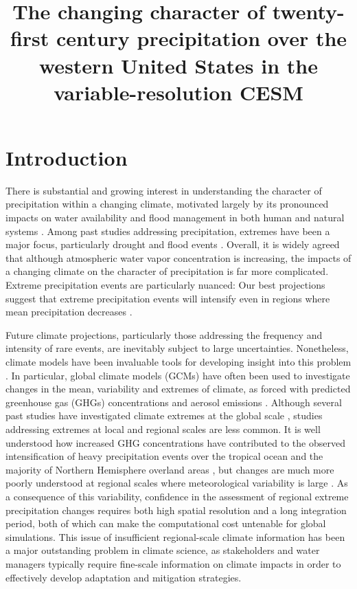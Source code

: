 \documentclass{ametsoc}
\title{The changing character of twenty-first century precipitation over the western United States in the variable-resolution CESM}
\affiliation{Department of Land, Air and Water Resources, University of California, Davis}
\begin{document}
\maketitle


%
\section{Introduction}

There is substantial and growing interest in understanding the character of precipitation within a changing climate, motivated largely by its pronounced impacts on water availability and flood management in both human and natural systems \citep{hegerl2004detectability, kharin2007changes, scoccimarro2013heavy}.  Among past studies addressing precipitation, extremes have been a major focus, particularly drought and flood events \citep{seneviratne2012changes}.  Overall, it is widely agreed that although atmospheric water vapor concentration is increasing, the impacts of a changing climate on the character of precipitation is far more complicated.  Extreme precipitation events are particularly nuanced:  Our best projections suggest that extreme precipitation events will intensify even in regions where mean precipitation decreases \citep{tebaldi2006going, kharin2007changes}.


Future climate projections, particularly those addressing the frequency and intensity of rare events, are inevitably subject to large uncertainties.  Nonetheless, climate models have been invaluable tools for developing insight into this problem \citep{easterling2000climate}. In particular, global climate models (GCMs) have often been used to investigate changes in the mean, variability and extremes of climate, as forced with predicted greenhouse gas (GHGs) concentrations and aerosol emissions \citep{meehl2006future}. Although several past studies have investigated climate extremes at the global scale \citep{seneviratne2012changes}, studies addressing extremes at local and regional scales are less common.  It is well understood how increased GHG concentrations have contributed to the observed intensification of heavy precipitation events over the tropical ocean \citep{allan2008atmospheric} and the majority of Northern Hemisphere overland areas \citep{min2011human}, but changes are much more poorly understood at regional scales where meteorological variability is large \citep{trenberth2011changes}.  As a consequence of this variability, confidence in the assessment of regional extreme precipitation changes requires both high spatial resolution and a long integration period, both of which can make the computational cost untenable for global simulations.  This issue of insufficient regional-scale climate information has been a major outstanding problem in climate science, as stakeholders and water managers typically require fine-scale information on climate impacts in order to effectively develop adaptation and mitigation strategies.
\end{document}

